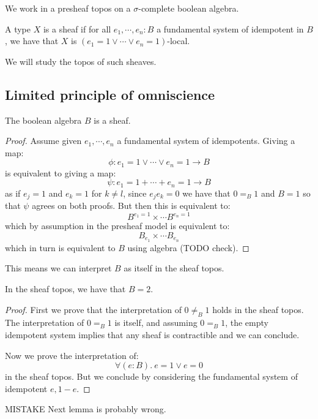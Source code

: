We work in a presheaf topos on a $\sigma$-complete boolean algebra.

\begin{definition}
A type $X$ is a sheaf if for all $e_1,\cdots,e_n:B$ a fundamental system of idempotent in $B$, we have that $X$ is $(e_1=1\lor\cdots\lor e_n=1)$-local.
\end{definition}

We will study the topos of such sheaves.

\subsection{Limited principle of omniscience}

\begin{lemma}
The boolean algebra $B$ is a sheaf.
\end{lemma}

\begin{proof}
Assume given $e_1,\cdots,e_n$ a fundamental system of idempotents. Giving a map:
\[\phi:e_1=1\lor\cdots\lor e_n=1 \to B\]
is equivalent to giving a map:
\[\psi : e_1=1+\cdots + e_n=1 \to B\]
as if $e_j = 1$ and $e_k=1$ for $k\not= l$, since $e_je_k=0$ we have that $0=_B1$ and $B=1$ so that $\psi$ agrees on both proofs. But then this is equivalent to:
\[B^{e_1=1}\times\cdots B^{e_n=1}\]
which by assumption in the presheaf model is equivalent to:
\[B_{e_1}\times\cdots B_{e_n}\]
which in turn is equivalent to $B$ using algebra (TODO check).
\end{proof}

This means we can interpret $B$ as itself in the sheaf topos.

\begin{lemma}\label{B-is-2-sigma-complete}
In the sheaf topos, we have that $B=2$.
\end{lemma}

\begin{proof}
First we prove that the interpretation of $0\not=_B1$ holds in the sheaf topos. The interpretation of $0=_B1$ is itself, and assuming $0=_B1$, the empty idempotent system implies that any sheaf is contractible and we can conclude.

Now we prove the interpretation of:
\[\forall(e:B).\ e=1 \lor e=0\]
in the sheaf topos. But we conclude by considering the fundamental system of idempotent $e,1-e$.
\end{proof}

MISTAKE Next lemma is probably wrong.

